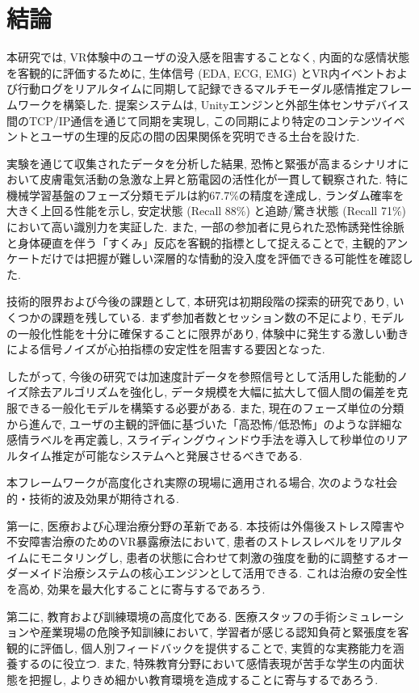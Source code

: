 \documentclass[book,paper=a4,fontsize=10pt,jafontscale=0.92]{jlreq}
\begin{document}
\chapter{結論}

本研究では, VR体験中のユーザの没入感を阻害することなく, 内面的な感情状態を客観的に評価するために, 生体信号 (EDA, ECG, EMG) とVR内イベントおよび行動ログをリアルタイムに同期して記録できるマルチモーダル感情推定フレームワークを構築した. 提案システムは, Unityエンジンと外部生体センサデバイス間のTCP/IP通信を通じて同期を実現し, この同期により特定のコンテンツイベントとユーザの生理的反応の間の因果関係を究明できる土台を設けた.

実験を通じて収集されたデータを分析した結果, 恐怖と緊張が高まるシナリオにおいて皮膚電気活動の急激な上昇と筋電図の活性化が一貫して観察された. 特に機械学習基盤のフェーズ分類モデルは約67.7\%の精度を達成し, ランダム確率を大きく上回る性能を示し, 安定状態 (Recall 88\%) と追跡/驚き状態 (Recall 71\%) において高い識別力を実証した. また, 一部の参加者に見られた恐怖誘発性徐脈と身体硬直を伴う「すくみ」反応を客観的指標として捉えることで, 主観的アンケートだけでは把握が難しい深層的な情動的没入度を評価できる可能性を確認した.

技術的限界および今後の課題として, 本研究は初期段階の探索的研究であり, いくつかの課題を残している. まず参加者数とセッション数の不足により, モデルの一般化性能を十分に確保することに限界があり, 体験中に発生する激しい動きによる信号ノイズが心拍指標の安定性を阻害する要因となった.

したがって, 今後の研究では加速度計データを参照信号として活用した能動的ノイズ除去アルゴリズムを強化し, データ規模を大幅に拡大して個人間の偏差を克服できる一般化モデルを構築する必要がある. また, 現在のフェーズ単位の分類から進んで, ユーザの主観的評価に基づいた「高恐怖/低恐怖」のような詳細な感情ラベルを再定義し, スライディングウィンドウ手法を導入して秒単位のリアルタイム推定が可能なシステムへと発展させるべきである.

本フレームワークが高度化され実際の現場に適用される場合, 次のような社会的・技術的波及効果が期待される.

第一に, 医療および心理治療分野の革新である. 本技術は外傷後ストレス障害や不安障害治療のためのVR暴露療法において, 患者のストレスレベルをリアルタイムにモニタリングし, 患者の状態に合わせて刺激の強度を動的に調整するオーダーメイド治療システムの核心エンジンとして活用できる. これは治療の安全性を高め, 効果を最大化することに寄与するであろう.

第二に, 教育および訓練環境の高度化である. 医療スタッフの手術シミュレーションや産業現場の危険予知訓練において, 学習者が感じる認知負荷と緊張度を客観的に評価し, 個人別フィードバックを提供することで, 実質的な実務能力を涵養するのに役立つ. また, 特殊教育分野において感情表現が苦手な学生の内面状態を把握し, よりきめ細かい教育環境を造成することに寄与するであろう.
\end{document}
